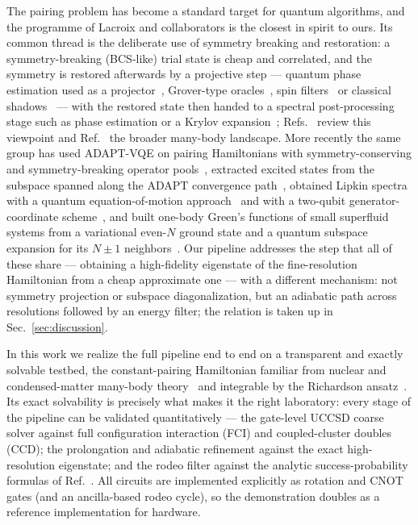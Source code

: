 \documentclass[
  aps,            %
  prc,            %
  reprint,        %
  superscriptaddress,
  floatfix,
  nofootinbib
]{revtex4-2}
\begin{document}
The pairing problem has become a standard target for quantum algorithms, and
the programme of Lacroix and collaborators is the closest in spirit to ours.
Its common thread is the deliberate use of symmetry breaking and
restoration: a symmetry-breaking (BCS-like) trial state is cheap and
correlated, and the symmetry is restored afterwards by a projective step ---
quantum phase estimation used as a projector~\cite{Lacroix2020}, Grover-type
oracles~\cite{RuizGuzman2023}, spin filters~\cite{Siwach2021} or classical
shadows~\cite{RuizGuzman2024} --- with the restored state then handed to a
spectral post-processing stage such as phase estimation or a Krylov
expansion~\cite{RuizGuzman2022,RuizGuzman2021}; Refs.~\cite{Lacroix2023EPJA,Lacroix2023}
review this viewpoint and Ref.~\cite{Ayral2023} the broader many-body landscape.  More
recently the same group has used ADAPT-VQE on pairing Hamiltonians with
symmetry-conserving and symmetry-breaking operator pools~\cite{Zhang2024},
extracted excited states from the subspace spanned along the ADAPT convergence
path~\cite{Zhang2025}, obtained Lipkin spectra with a quantum
equation-of-motion approach~\cite{Hlatshwayo2022} and with a two-qubit
generator-coordinate scheme~\cite{BeaujeaultTaudiere2024}, and
built one-body Green's functions of small superfluid systems from a
variational even-$N$ ground state and a quantum subspace expansion for its
$N\pm1$ neighbors~\cite{AychetClaisse2026}.  Our pipeline addresses the step
that all of these share --- obtaining a high-fidelity eigenstate of the
fine-resolution Hamiltonian from a cheap approximate one --- with a different
mechanism: not symmetry projection or subspace diagonalization, but an
adiabatic path across resolutions followed by an energy filter; the relation
is taken up in Sec.~\ref{sec:discussion}.

In this work we realize the full pipeline end to end on a transparent and exactly
solvable testbed, the constant-pairing Hamiltonian familiar from nuclear and
condensed-matter many-body theory~\cite{LNP936} and integrable by the Richardson
ansatz~\cite{Richardson1963,RichardsonSherman1964,Dukelsky2004}.  Its exact
solvability is precisely what makes it the right laboratory: every stage of the
pipeline can be validated quantitatively --- the gate-level UCCSD coarse solver
against full configuration interaction (FCI) and coupled-cluster doubles (CCD); the
prolongation and adiabatic refinement against the exact high-resolution eigenstate;
and the rodeo filter against the analytic success-probability formulas of
Ref.~\cite{Qian2024}.  All circuits are implemented explicitly as rotation and CNOT
gates (and an ancilla-based rodeo cycle), so the demonstration doubles as a
reference implementation for hardware.
\end{document}
